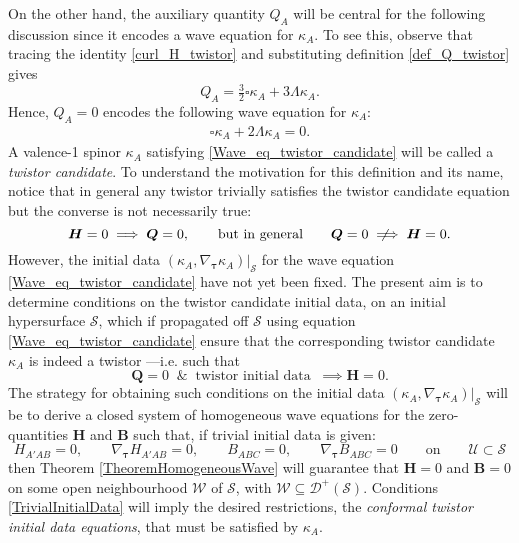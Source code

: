 \documentclass[10pt,a4paper]{article}
\theoremstyle{plain}
\def\bmB{{\bm B}}
\def\bmH{{\bm H}}
\def\bmQ{{\bm Q}}
\newcommand{\notimplies}{%
  \mathrel{{\ooalign{\hidewidth$\not\phantom{=}$\hidewidth\cr$\implies$}}}}
\begin{document}
  On the other hand, the auxiliary quantity
  $Q_A$ will be central for the following discussion since it
  encodes a wave equation for $\kappa_A$. To see this, observe that
  tracing the identity \eqref{curl_H_twistor} and substituting 
  definition \eqref{def_Q_twistor} gives
\begin{equation}\label{Q_to_box_twistor_candidate}
Q_{A} = \tfrac{3}{2} \square \kappa _{A} + 3 \Lambda \kappa _{A}.
\end{equation}
Hence, $Q_{A}=0$ encodes the following wave equation for $\kappa_A$:
\begin{align} \label{Wave_eq_twistor_candidate}
\square \kappa_{A} + 2 \Lambda  \kappa_{A} =0.
\end{align}
A valence-1 spinor $\kappa_A$ satisfying \eqref{Wave_eq_twistor_candidate} will be called a \emph{twistor candidate}. To understand the
motivation for this definition and its name, notice that in general
any twistor trivially satisfies the twistor candidate
equation but the converse is not necessarily true:
\[
\bmH=0 \implies \bmQ =0, \qquad \text{but in general} \qquad \bmQ =0 \notimplies \bmH=0.
\]
However,  the initial data $(\kappa_A, \nabla_{\bm\tau}
\kappa_A)|_{\mathcal{S}}$ for the wave equation
\eqref{Wave_eq_twistor_candidate} have not yet been fixed. The present aim is to determine conditions on the twistor candidate initial data, on an initial hypersurface $\mathcal{S}$, which if propagated off $\mathcal{S}$ using
equation \eqref{Wave_eq_twistor_candidate} ensure that the corresponding twistor
candidate $\kappa_A$ is indeed a twistor ---i.e. such that
\begin{equation}
\bmQ =0 \;\;\&\;\; \text{twistor initial data} \;\;\implies \bmH=0.
\end{equation}
The strategy for obtaining such conditions on the initial data
$(\kappa_A, \nabla_{\bm\tau}
\kappa_A)|_{\mathcal{S}}$ will be to derive a closed
system of homogeneous wave equations for the zero-quantities $\bmH$
and $\bmB$ such that, if trivial initial data is given:
\begin{equation}\label{TrivialInitialData}
H_{A'AB}=0, \qquad \nabla_{\bm\tau} H_{A'AB}=0, \qquad B_{ABC}=0,
\qquad \nabla_{\bm\tau} B_{ABC}=0 \qquad \text{on} \qquad
\mathcal{U}\subset\mathcal{S}
\end{equation}
then Theorem \ref{TheoremHomogeneousWave} will guarantee that
$\bmH=0$ and $\bmB=0$ on some open neighbourhood $\mathcal{W}$ of $\mathcal{S}$, with
$\mathcal{W}\subseteq \mathcal{D}^{+}(\mathcal{S})$. Conditions \eqref{TrivialInitialData} will imply the desired restrictions, the \emph{conformal twistor initial data equations}, that must be satisfied by $\kappa_A$.  
\end{document}
